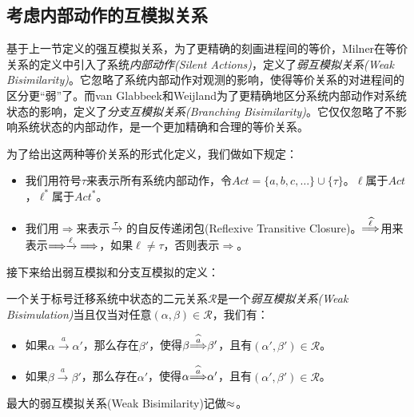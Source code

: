 \subsection{考虑内部动作的互模拟关系}
\label{subsec:silent-bis}

基于上一节定义的强互模拟关系，为了更精确的刻画进程间的等价，Milner在等价关系的定义中引入了系统\emph{内部动作(Silent Actions)}，定义了\emph{弱互模拟关系(Weak Bisimilarity)}\cite{Milner1989}。它忽略了系统内部动作对观测的影响，使得等价关系的对进程间的区分更``弱''了。而van Glabbeek和Weijland为了更精确地区分系统内部动作对系统状态的影响，定义了\emph{分支互模拟关系(Branching Bisimilarity)}\cite{Glabbeek1996}。它仅仅忽略了不影响系统状态的内部动作，是一个更加精确和合理的等价关系。

为了给出这两种等价关系的形式化定义，我们做如下规定：
\begin{itemize}
    \item 我们用符号$\tau$来表示所有系统内部动作，令$Act=\{a,b,c,\ldots\}\cup\{\tau\}$。$\ell$属于$Act$，$\ell^{*}$属于$Act^{*}$。

    \item 我们用$\Longrightarrow$来表示${\xrightarrow{\tau}{}}$的自反传递闭包(Reflexive Transitive Closure)。${\stackrel{\widehat{\ell}}{\Longrightarrow}}$用来表示${\stackrel{}{\Longrightarrow}}{\xrightarrow{\ell}{}}{\stackrel{}{\Longrightarrow}}$，如果$\ell\not=\tau$，否则表示$\Longrightarrow$。
\end{itemize}

接下来给出弱互模拟和分支互模拟的定义：
\begin{defn}\label{def:weak-bis}
一个关于标号迁移系统中状态的二元关系$\mathcal{R}$是一个\emph{弱互模拟关系(Weak Bisimulation)}当且仅当对任意$(\alpha,\beta)\in \mathcal{R}$，我们有：
\begin{itemize}
   \item 如果$\alpha\stackrel{a}{\longrightarrow}\alpha'$，那么存在$\beta'$，使得$\beta{\stackrel{\widehat{a}}{\Longrightarrow}}\beta'$，且有$(\alpha',\beta')\in\mathcal{R}$。
   \item 如果$\beta\stackrel{a}{\longrightarrow}\beta'$，那么存在$\alpha'$，使得$\alpha{\stackrel{\widehat{a}}{\Longrightarrow}}\alpha'$，且有$(\alpha',\beta')\in\mathcal{R}$。
\end{itemize}
最大的弱互模拟关系(Weak Bisimilarity)记做$\approx$。
\end{defn}

